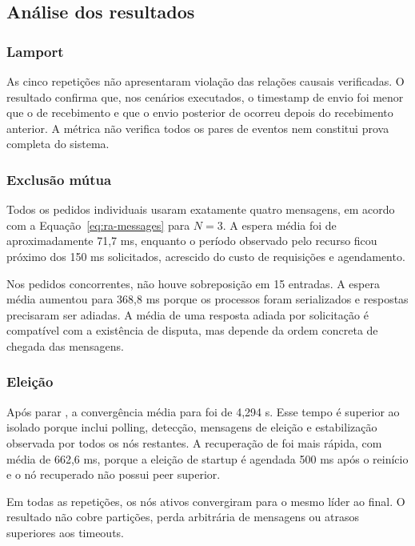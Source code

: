 \subsection{Análise dos resultados}

\subsubsection{Lamport}

As cinco repetições não apresentaram violação das relações causais verificadas. O resultado confirma que, nos cenários executados, o timestamp de envio foi menor que o de recebimento e que o envio posterior de  ocorreu depois do recebimento anterior. A métrica não verifica todos os pares de eventos nem constitui prova completa do sistema.

\subsubsection{Exclusão mútua}

Todos os pedidos individuais usaram exatamente quatro mensagens, em acordo com a Equação~\ref{eq:ra-messages} para $N=3$. A espera média foi de aproximadamente 71,7 ms, enquanto o período observado pelo recurso ficou próximo dos 150 ms solicitados, acrescido do custo de requisições e agendamento.

Nos pedidos concorrentes, não houve sobreposição em 15 entradas. A espera média aumentou para 368,8 ms porque os processos foram serializados e respostas precisaram ser adiadas. A média de uma resposta adiada por solicitação é compatível com a existência de disputa, mas depende da ordem concreta de chegada das mensagens.

\subsubsection{Eleição}

Após parar , a convergência média para  foi de 4,294 s. Esse tempo é superior ao  isolado porque inclui polling, detecção, mensagens de eleição e estabilização observada por todos os nós restantes. A recuperação de  foi mais rápida, com média de 662,6 ms, porque a eleição de startup é agendada 500 ms após o reinício e o nó recuperado não possui peer superior.

Em todas as repetições, os nós ativos convergiram para o mesmo líder ao final. O resultado não cobre partições, perda arbitrária de mensagens ou atrasos superiores aos timeouts.

